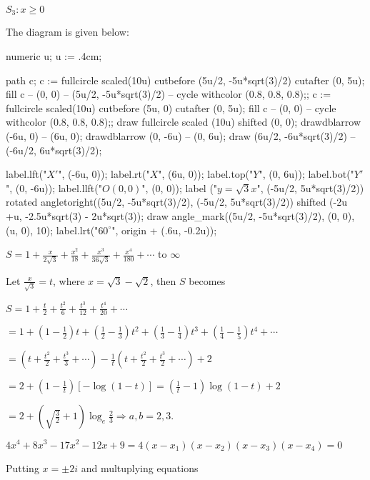   $S_3: x \geq 0$

  The diagram is given below:

    \startplacefigure[location=force]
    \startMPcode
      numeric u;
      u := .4cm;

      path c;
      c := fullcircle scaled(10u) cutbefore (5u/2, -5u*sqrt(3)/2) cutafter (0, 5u);
      fill c -- (0, 0) -- (5u/2, -5u*sqrt(3)/2) -- cycle withcolor (0.8, 0.8, 0.8);;
      c := fullcircle scaled(10u) cutbefore (5u, 0) cutafter (0, 5u);
      fill c -- (0, 0) -- cycle withcolor (0.8, 0.8, 0.8);;
      draw fullcircle scaled (10u) shifted (0, 0);
      drawdblarrow (-6u, 0) -- (6u, 0);
      drawdblarrow (0, -6u) -- (0, 6u);
      draw (6u/2, -6u*sqrt(3)/2) -- (-6u/2, 6u*sqrt(3)/2);

      label.lft("$X'$", (-6u, 0));
      label.rt("$X$", (6u, 0));
      label.top("$Y$", (0, 6u));
      label.bot("$Y'$", (0, -6u));
      label.llft("$O(0, 0)$", (0, 0));
      label ("$y = \sqrt{3}x$", (-5u/2, 5u*sqrt(3)/2)) rotated angletoright((5u/2, -5u*sqrt(3)/2),
      (-5u/2, 5u*sqrt(3)/2)) shifted (-2u +u, -2.5u*sqrt(3) - 2u*sqrt(3));
      draw angle_mark((5u/2, -5u*sqrt(3)/2), (0, 0), (u, 0), 10);
      label.lrt("$60^\circ$", origin + (.6u, -0.2u));
    \stopMPcode
  \stopplacefigure
\item $S = 1 + \frac{x}{2\sqrt{3}} + \frac{x^2}{18} + \frac{x^3}{36\sqrt{3}} + \frac{x^4}{180} + \cdots$ to
  $\infty$

  Let $\frac{x}{\sqrt{3}} = t$, where $x = \sqrt{3} - \sqrt{2}$, then $S$ becomes

  $S = 1 + \frac{t}{2} + \frac{t^2}{6} + \frac{t^3}{12} + \frac{t^4}{20} + \cdots$

  $= 1 + \left(1 - \frac{1}{2}\right)t + \left(\frac{1}{2} - \frac{1}{3}\right)t^2 + \left(\frac{1}{3}
  - \frac{1}{4}\right)t^3 + \left(\frac{1}{4} - \frac{1}{5}\right)t^4 + \cdots$

  $= \left(t + \frac{t^2}{2} + \frac{t^3}{3} + \cdots\right) - \frac{1}{t}\left(t + \frac{t^2}{2}
  + \frac{t^3}{2} + \cdots\right) +2$

  $= 2 + \left(1 - \frac{1}{t}\right)[-\log(1 - t)] = \left(\frac{1}{t} - 1\right)\log(1 - t) + 2$

  $= 2 + \left(\sqrt{\frac{3}{2}} + 1\right)\log_e\frac{2}{3}\Rightarrow a, b = 2, 3$.
\item $4x^4 + 8x^3 - 17x^2 - 12x + 9 = 4(x - x_1)(x - x_2)(x - x_3)(x - x_4) =0$

  Putting $x = \pm 2i$ and multuplying equations

